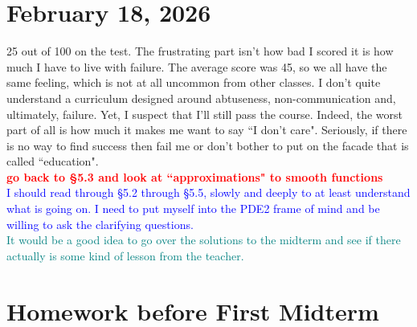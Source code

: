 \documentclass[12pt,a4paper]{report}
\newcommand{\RED}[1]{\textcolor{red}{#1}}
\newcommand{\BLUE}[1]{\textcolor{blue}{#1}}
\newcommand{\GREEN}[1]{\textcolor{teal}{#1}}
\begin{document}
\HLINE
\section*{February 18, 2026}

25 out of 100 on the test.  The frustrating part isn't how bad I scored it is how much I have to live with failure.  The average score was 45, so we all have the same feeling, which is not at all uncommon from other classes.  I don't quite understand a curriculum designed around abtuseness, non-communication and, ultimately, failure.  Yet, I suspect that I'll still pass the course.  Indeed, the worst part of all is how much it makes me want to say ``I don't care".  Seriously, if there is no way to find success then fail me or don't bother to put on the facade that is called ``education".\\

\RED{\textbf{go back to \S5.3 and look at ``approximations" to smooth functions}}\\

\BLUE{I should read through \S5.2 through \S5.5, slowly and deeply to at least understand what is going on.  I need to put myself into the PDE2 frame of mind and be willing to ask the clarifying questions.}\\

\GREEN{It would be a good idea to go over the solutions to the midterm and see if there actually is some kind of lesson from the teacher.}

\section*{Homework before First Midterm}
\end{document}
